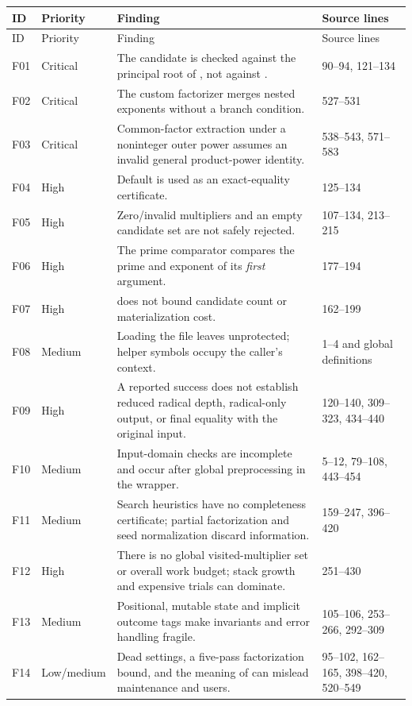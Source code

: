 \documentclass[11pt,letterpaper]{article}
\newcommand{\code}[1]{\texttt{\detokenize{#1}}}
\theoremstyle{definition}
\theoremstyle{remark}
\begin{document}
\small
\begin{longtable}{@{}p{}p{}p{}p{}@{}}
\toprule
ID & Priority & Finding & Source lines \\
\midrule
\endfirsthead
\toprule ID & Priority & Finding & Source lines \\\midrule
\endhead
F01 & Critical & The candidate is checked against the principal root of
\code{problem^r}, not against \code{problem}. & 90--94, 121--134 \\
F02 & Critical & The custom factorizer merges nested exponents without a
branch condition. & 527--531 \\
F03 & Critical & Common-factor extraction under a noninteger outer power
assumes an invalid general product-power identity. & 538--543, 571--583 \\
F04 & High & Default \code{PossibleZeroQ} is used as an exact-equality
certificate. & 125--134 \\
F05 & High & Zero/invalid multipliers and an empty candidate set are not
safely rejected. & 107--134, 213--215 \\
F06 & High & The prime comparator compares the prime and exponent of its
\emph{first} argument. & 177--194 \\
F07 & High & \code{multipliercap = 1000} does not bound candidate count or
materialization cost. & 162--199 \\
F08 & Medium & Loading the file leaves \code{Print} unprotected; helper
symbols occupy the caller's context. & 1--4 and global definitions \\
F09 & High & A reported success does not establish reduced radical depth,
radical-only output, or final equality with the original input. & 120--140,
309--323, 434--440 \\
F10 & Medium & Input-domain checks are incomplete and occur after global
preprocessing in the wrapper. & 5--12, 79--108, 443--454 \\
F11 & Medium & Search heuristics have no completeness certificate; partial
factorization and seed normalization discard information. & 159--247,
396--420 \\
F12 & High & There is no global visited-multiplier set or overall work budget;
stack growth and expensive trials can dominate. & 251--430 \\
F13 & Medium & Positional, mutable state and implicit outcome tags make
invariants and error handling fragile. & 105--106, 253--266, 292--309 \\
F14 & Low/medium & Dead settings, a five-pass factorization bound, and the
meaning of \code{alllevels} can mislead maintenance and users. & 95--102,
162--165, 398--420, 520--549 \\
\bottomrule
\end{longtable}
\normalsize
\end{document}
